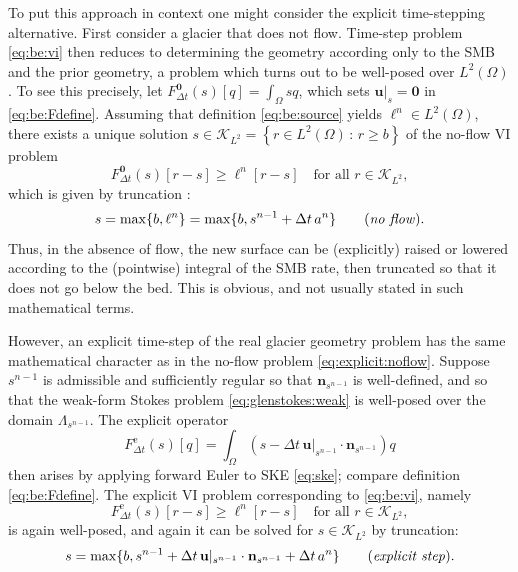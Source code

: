 \documentclass[hidelinks,onefignum,onetabnum,final]{siamart220329}  %
\newcommand{\bn}{\mathbf{n}}
\newcommand{\bu}{\mathbf{u}}
\newcommand{\bzero}{\bm{0}}
\newcommand{\cK}{\mathcal{K}}
\begin{document}
To put this approach in context one might consider the explicit time-stepping alternative.  First consider a glacier that does not flow.  Time-step problem \eqref{eq:be:vi} then reduces to determining the geometry according only to the SMB and the prior geometry, a problem which turns out to be well-posed over $L^2(\Omega)$.  To see this precisely, let $F^{\bzero}_{\Delta t}(s)[q] = \int_\Omega sq$, which sets $\bu|_s=\bzero$ in \eqref{eq:be:Fdefine}.  Assuming that definition \eqref{eq:be:source} yields $\ell^n \in L^2(\Omega)$, there exists a unique solution $s \in \cK_{L^2} = \left\{r\in L^2(\Omega)\,:\,r \ge b\right\}$ of the no-flow VI problem
\begin{equation}
F^{\bzero}_{\Delta t}(s)[r-s] \ge \ell^n[r-s] \quad \text{for all } r \in \cK_{L^2}, \label{eq:explicit:noflow}
\end{equation}
which is given by truncation \cite[section II.3]{KinderlehrerStampacchia1980}:
\begin{equation}
s = \max\{b, \ell^n\} = \max\{b, s^{n-1} + \Delta t\,a^n\} \qquad (\text{\emph{no flow}}).
\end{equation}
Thus, in the absence of flow, the new surface can be (explicitly) raised or lowered according to the (pointwise) integral of the SMB rate, then truncated so that it does not go below the bed.  This is obvious, and not usually stated in such mathematical terms.

However, an explicit time-step of the real glacier geometry problem has the same mathematical character as in the no-flow problem \eqref{eq:explicit:noflow}.  Suppose $s^{n-1}$ is admissible and sufficiently regular so that $\bn_{s^{n-1}}$ is well-defined, and so that the weak-form Stokes problem \eqref{eq:glenstokes:weak} is well-posed over the domain $\Lambda_{s^{n-1}}$.  The explicit operator
\begin{equation}
F^{\text{e}}_{\Delta t}(s)[q] = \int_\Omega \left(s - \Delta t\, \bu|_{s^{n-1}} \cdot \bn_{s^{n-1}}\right) q  \label{eq:explicitFdefine}
\end{equation}
then arises by applying forward Euler to SKE \eqref{eq:ske}; compare definition \eqref{eq:be:Fdefine}.  The explicit VI problem corresponding to \eqref{eq:be:vi}, namely
\begin{equation}
F^{\text{e}}_{\Delta t}(s)[r-s] \ge \ell^n[r-s] \quad \text{for all } r \in \cK_{L^2}, \label{eq:explicit:vi}
\end{equation}
is again well-posed, and again it can be solved for $s \in \cK_{L^2}$ by truncation:
\begin{equation}
s = \max\{b, s^{n-1} + \Delta t\, \bu|_{s^{n-1}} \cdot \bn_{s^{n-1}} + \Delta t\,a^n\} \qquad (\text{\emph{explicit step}}). \label{eq:explicit:solution}
\end{equation}
\end{document}
